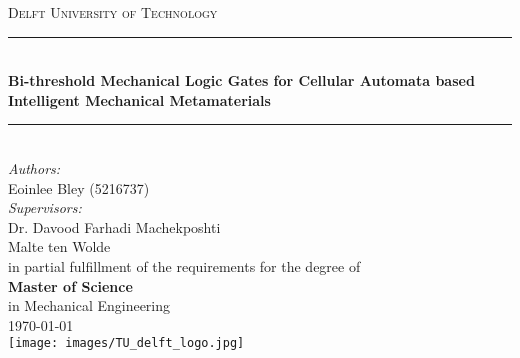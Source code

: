 \documentclass[a4paper]{article}
\begin{document}
\begin{titlepage}

\newcommand{\HRule}{\rule{\linewidth}{0.5mm}} 							%
\center 
 
\textsc{\LARGE Delft University of Technology}\\[1cm]

\HRule \\[0.8cm]
{ \huge \bfseries Bi-threshold Mechanical Logic Gates for Cellular Automata based Intelligent Mechanical Metamaterials }\\[0.7cm]								%
\HRule \\[1cm]
\large
\emph{Authors:}\\
Eoinlee Bley (5216737)\\[1.5cm]	
\emph{Supervisors:}\\
Dr. Davood Farhadi Machekposhti\\
Malte ten Wolde\\[0.5cm]
in partial fulfillment of the requirements for the degree of \\[0.5cm]
\textbf{Master of Science}\\
in Mechanical Engineering\\[0.5cm]
{\large \today}\\[5cm]
\texttt{[image: images/TU\_delft\_logo.jpg]}\\[1cm] 	%
\vfill 
\end{titlepage}

\begin{abstract}

\end{abstract}





\newpage



\end{document}
